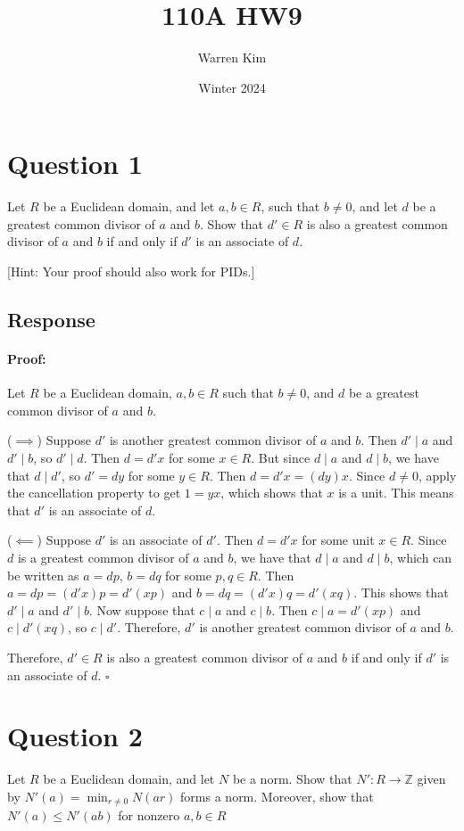 \documentclass [12pt] {article}
\title{110A HW9}
\author{Warren Kim}
\date{Winter 2024}
\newcommand{\Z}{\mathbb{Z}}
\newenvironment{proof}{\paragraph{Proof:}}{\hfill$\square$}
\begin{document}
\maketitle

\section*{Question 1}
Let $R$ be a Euclidean domain, and let $a,b\in R$, such that $b\neq 0$, and let $d$ be a greatest
common divisor of $a$ and $b$. Show that $d'\in R$ is also a greatest common divisor of $a$ and $b$
if and only if $d'$ is an associate of $d$.

[Hint: Your proof should also work for PIDs.]
\subsection*{Response}
\begin{proof}
    Let $R$ be a Euclidean domain, $a, b \in R$ such that $b \neq 0$, and $d$ be a greatest common
    divisor of $a$ and $b$.

    ($\implies$)
    Suppose $d'$ is another greatest common divisor of $a$ and $b$. Then $d' \mid a$ and
    $d' \mid b$, so $d' \mid d$. Then $d = d'x$ for some $x \in R$. But since $d \mid a$ and
    $d \mid b$, we have that $d \mid d'$, so $d' = dy$ for some $y \in R$. Then $d = d'x = (dy)x$.
    Since $d \neq 0$, apply the cancellation property to get $1 = yx$, which shows that $x$ is a
    unit. This means that $d'$ is an associate of $d$.
    \vspace{0.5em}

    ($\impliedby$)
    Suppose $d'$ is an associate of $d'$. Then $d = d'x$ for some unit $x \in R$. Since $d$ is a
    greatest common divisor of $a$ and $b$, we have that $d \mid a$ and $d \mid b$, which can be
    written as $a = dp$, $b = dq$ for some $p, q \in R$. Then $a = dp = (d'x)p = d'(xp)$ and
    $b = dq = (d'x)q = d'(xq)$. This shows that $d' \mid a$ and $d' \mid b$. Now suppose that
    $c \mid a$ and $c \mid b$. Then $c \mid a = d'(xp)$ and $c \mid d'(xq)$, so $c \mid d'$.
    Therefore, $d'$ is another greatest common divisor of $a$ and $b$.
    \vspace{0.5em}

    Therefore, $d' \in R$ is also a greatest common divisor of $a$ and $b$ if and only if $d'$ is an
    associate of $d$.
\end{proof}
\newpage


\section*{Question 2}
Let $R$ be a Euclidean domain, and let $N$ be a norm. Show that $N':R\to\Z$ given by
$N'(a) = \min_{r\neq 0} N(ar)$ forms a norm. Moreover, show that $N'(a)\leq N'(ab)$ for nonzero
$a,b\in R$
\end{document}
